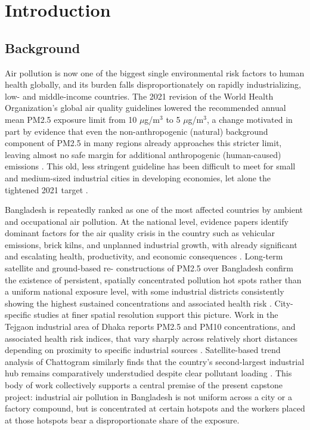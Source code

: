 \chapter{Introduction}
\label{ch:introduction}

\section{Background}
\label{sec:background}

Air pollution is now one of the biggest single environmental risk factors to human health globally, and its burden falls disproportionately on rapidly industrializing, low- and middle-income countries. The 2021 revision of the World Health Organization’s global air quality guidelines lowered the recommended annual mean PM2.5 exposure limit from 10 $\mu$g/m$^3$ to 5 $\mu$g/m$^3$, a change motivated in part by evidence that even the non-anthropogenic (natural) background component of PM2.5 in many regions already approaches this stricter limit, leaving almost no safe margin for additional anthropogenic (human-caused) emissions \citep{pai2022who}. This old, less stringent guideline has been difficult to meet for small and medium-sized industrial cities in developing economies, let alone the tightened 2021 target \citep{polezer2023new}.

Bangladesh is repeatedly ranked as one of the most affected countries by ambient and occupational air pollution. At the national level, evidence papers identify dominant factors for the air quality crisis in the country such as vehicular emissions, brick kilns, and unplanned industrial growth, with already significant and escalating health, productivity, and economic consequences \citep{khatun2023evidence}. Long-term satellite and ground-based re- constructions of PM2.5 over Bangladesh confirm the existence of persistent, spatially concentrated pollution hot spots rather than a uniform national exposure level, with some industrial districts consistently showing the highest sustained concentrations and associated health risk \citep{ali2025longterm}. City-specific studies at finer spatial resolution support this picture. Work in the Tejgaon industrial area of Dhaka reports PM2.5 and PM10 concentrations, and associated health risk indices, that vary sharply across relatively short distances depending on proximity to specific industrial sources \citep{basak2025spatial}. Satellite-based trend analysis of Chattogram similarly finds that the country’s second-largest industrial hub remains comparatively understudied despite clear pollutant loading \citep{huraira2024spatial}. This body of work collectively supports a central premise of the present capstone project: industrial air pollution in Bangladesh is not uniform across a city or a factory compound, but is concentrated at certain hotspots and the workers placed at those hotspots bear a disproportionate share of the exposure.

